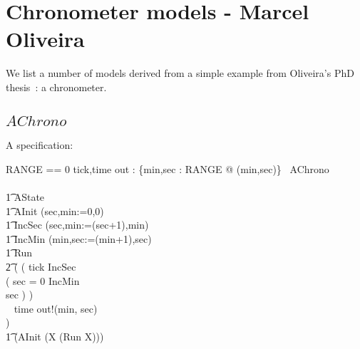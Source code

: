 \section{Chronometer models - Marcel Oliveira~\cite{MV05}}

We list a number of models derived from a simple example from
Oliveira's PhD thesis~\cite{MV05}: a chronometer.

\subsection{$AChrono$}


A specification:
\begin{circus}
RANGE == 0 
\also \circchannel tick,time
\also \circchannel out : \{min,sec : RANGE @ (min,sec)\}
\also
\circprocess\ AChrono \circdef\\
\circbegin\\
\t1 \circstate AState \\
\t1 AInit \circdef (sec,min:=0,0)\\
\t1 IncSec \circdef (sec,min:=(sec+1),min)\\
\t1 IncMin \circdef (min,sec:=(min+1),sec)\\
\t1 Run \circdef \\
\t2 (
(
  tick \then IncSec \circseq \\
      (
        \circif sec = 0 \circthen IncMin\\
        \circelse sec  \circthen \Skip \circfi
      )
)\\
    \extchoice~ time \then out!(min, sec) \then \Skip \\
)\\
\t1 \circspot (AInit \circseq (\circmu X \circspot (Run \circseq X)))\\
\circend
\end{circus}


